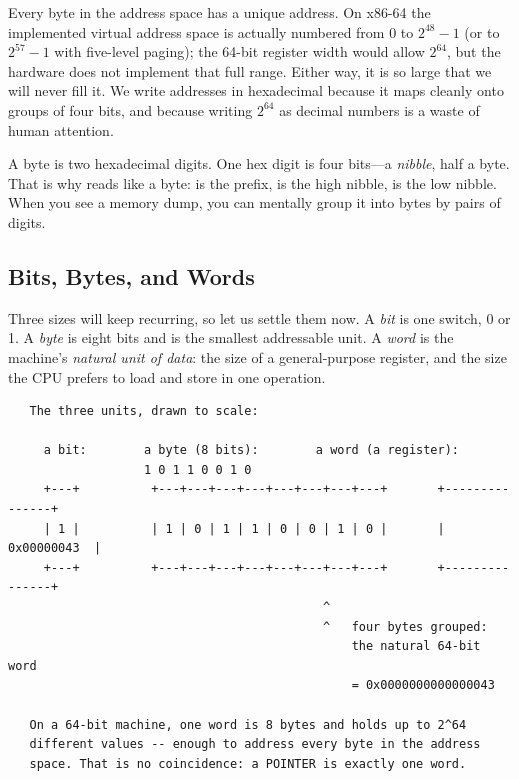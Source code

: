 Every byte in the address space has a unique address. On x86-64 the
implemented virtual address space is actually numbered from $0$ to
$2^{48}-1$ (or to $2^{57}-1$ with five-level paging); the 64-bit register width
would allow $2^{64}$, but the hardware does not implement that full range. Either
way, it is so large that we will never fill it. We write addresses in hexadecimal
because it maps cleanly onto groups of four bits, and because writing
$2^{64}$ as decimal numbers is a waste of human attention.

\begin{insight}
A byte is two hexadecimal digits. One hex digit is four bits---a
\emph{nibble}, half a byte. That is
why  reads like a byte:  is the prefix,  is
the high nibble,  is the low nibble. When you see a memory
dump, you can mentally group it into bytes by pairs of digits.
\end{insight}

\subsection{Bits, Bytes, and Words}

Three sizes will keep recurring, so let us settle them now. A
\emph{bit} is one switch, 0 or 1. A \emph{byte} is eight bits and is
the smallest addressable unit. A \emph{word} is the machine's
\emph{natural unit of data}: the size of a general-purpose register,
and the size the CPU prefers to load and store in one operation.

\begin{verbatim}
   The three units, drawn to scale:

     a bit:        a byte (8 bits):        a word (a register):
                   1 0 1 1 0 0 1 0
     +---+          +---+---+---+---+---+---+---+---+       +---------------+
     | 1 |          | 1 | 0 | 1 | 1 | 0 | 0 | 1 | 0 |       |   0x00000043  |
     +---+          +---+---+---+---+---+---+---+---+       +---------------+
                                            ^
                                            ^   four bytes grouped:
                                                the natural 64-bit word
                                                = 0x0000000000000043

   On a 64-bit machine, one word is 8 bytes and holds up to 2^64
   different values -- enough to address every byte in the address
   space. That is no coincidence: a POINTER is exactly one word.
\end{verbatim}

